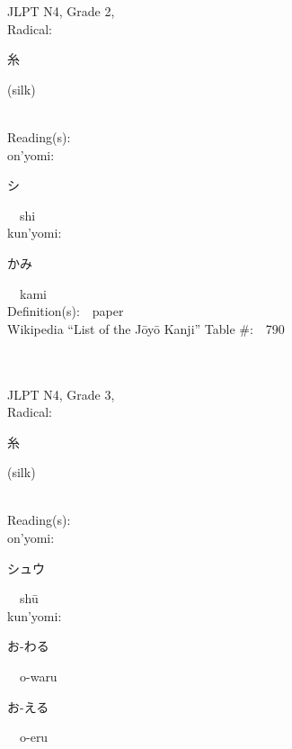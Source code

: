 \begin{multicols}{2}
{JLPT N4, Grade 2, \\Radical:\ \ {\begin{CJK}{UTF8}{min} 糸 \end{CJK}} (silk) } \\
Reading(s):\ \ \\
{\hspace*{1em}}on'yomi:\ \ \\
{\hspace*{2em}}{\begin{CJK}{UTF8}{min} シ \end{CJK}}\ \ shi\ \ \\
{\hspace*{1em}}kun'yomi:\ \ \\
{\hspace*{2em}}{\begin{CJK}{UTF8}{min} かみ \end{CJK}}\ \ kami\ \ \\
Definition(s):\ \ paper \\
Wikipedia ``List of the J\=oy\=o Kanji'' Table \#:\ \ 790 \\
\ \ \\
{\fontsize{34pt}{40pt}  }\ \ \\  %
{JLPT N4, Grade 3, \\Radical:\ \ {\begin{CJK}{UTF8}{min} 糸 \end{CJK}} (silk) } \\
Reading(s):\ \ \\
{\hspace*{1em}}on'yomi:\ \ \\
{\hspace*{2em}}{\begin{CJK}{UTF8}{min} シュウ \end{CJK}}\ \ sh\=u\ \ \\
{\hspace*{1em}}kun'yomi:\ \ \\
{\hspace*{2em}}{\begin{CJK}{UTF8}{min} お-わる \end{CJK}}\ \ o-waru\ \ \\
{\hspace*{2em}}{\begin{CJK}{UTF8}{min} お-える \end{CJK}}\ \ o-eru\ \ \\

\end{multicols}
